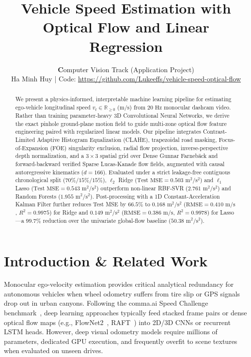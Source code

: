\documentclass[10pt,twocolumn]{article}
\title{\vspace{-1.5em}\textbf{Vehicle Speed Estimation with Optical Flow and Linear Regression}\vspace{-0.45em}}
\author{
  \textbf Computer Vision Track (Application Project)\\
  \footnotesize Ha Minh Huy \;|\; Code: \url{https://github.com/Lukeeffs/vehicle-speed-optical-flow}
}
\date{\vspace{-1.3em}}
\begin{document}
\maketitle

\begin{abstract}
\noindent We present a physics-informed, interpretable machine learning pipeline for estimating ego-vehicle longitudinal speed $v_t \in \mathbb{R}_{\ge 0}$ ($\text{m/s}$) from $20\text{ Hz}$ monocular dashcam video. Rather than training parameter-heavy 3D Convolutional Neural Networks, we derive the exact pinhole ground-plane motion field to guide multi-zone optical flow feature engineering paired with regularized linear models. Our pipeline integrates Contrast-Limited Adaptive Histogram Equalization (CLAHE), trapezoidal road masking, Focus-of-Expansion (FOE) singularity exclusion, radial flow projection, inverse-perspective depth normalization, and a $3 \times 3$ spatial grid over Dense Gunnar Farneb\"{a}ck and forward-backward verified Sparse Lucas-Kanade flow fields, augmented with causal autoregressive kinematics ($d=166$). Evaluated under a strict leakage-free contiguous chronological split ($70\%/15\%/15\%$), $\ell_2$ Ridge ($\text{Test MSE} = 0.503\text{ m}^2/\text{s}^2$) and $\ell_1$ Lasso ($\text{Test MSE} = 0.543\text{ m}^2/\text{s}^2$) outperform non-linear RBF-SVR ($2.761\text{ m}^2/\text{s}^2$) and Random Forests ($1.955\text{ m}^2/\text{s}^2$). Post-processing with a 1D Constant-Acceleration Kalman Filter further reduces Test MSE by $66.5\%$ to $0.168\text{ m}^2/\text{s}^2$ ($\text{RMSE} = 0.410\text{ m/s}$, $R^2 = 0.9975$) for Ridge and $0.149\text{ m}^2/\text{s}^2$ ($\text{RMSE} = 0.386\text{ m/s}$, $R^2 = 0.9978$) for Lasso---a $99.7\%$ reduction over the univariate global-flow baseline ($50.38\text{ m}^2/\text{s}^2$).
\end{abstract}

\section{Introduction \& Related Work}
Monocular ego-velocity estimation provides critical analytical redundancy for autonomous vehicles when wheel odometry suffers from tire slip or GPS signals drop out in urban canyons. Following the comma.ai Speed Challenge benchmark~\cite{comma2017}, deep learning approaches typically feed stacked frame pairs or dense optical flow maps (e.g., FlowNet2~\cite{ilg2017}, RAFT~\cite{teed2020}) into 2D/3D CNNs or recurrent LSTM heads. However, deep visual odometry models require millions of parameters, dedicated GPU execution, and frequently overfit to scene textures when evaluated on unseen drives.
\end{document}
